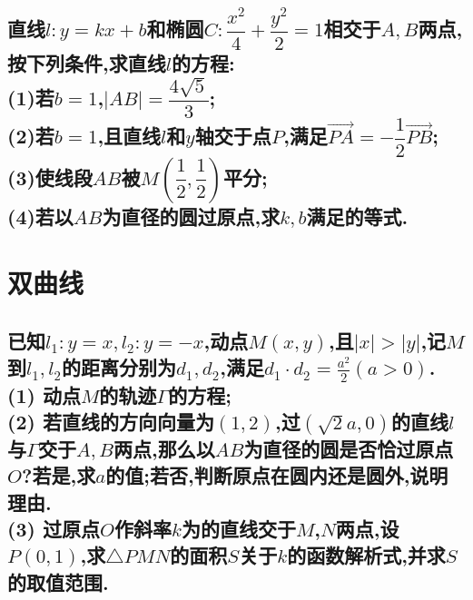 \documentclass[oneside]{book}
\newcommand{\1}{\underline{\makebox[1cm]{}}}
\newcommand{\2}{\underline{\makebox[2cm]{}}}
\newcommand{\3}{\underline{\makebox[3cm]{}}}
\newcommand{\4}{\underline{\makebox[4cm]{}}}
\newcommand{\xl}{\overrightarrow}
\begin{document}
        \section{直线$l:y=kx+b$和椭圆$C:\dfrac{x^2}{4}+\dfrac{y^2}{2}=1$相交于$A,B$两点,按下列条件,求直线$l$的方程:\\(1)若$b=1$,$|AB|=\dfrac{4\sqrt{5}}{3}$;\\(2)若$b=1$,且直线$l$和$y$轴交于点$P$,满足$\xl{PA}=-\dfrac{1}{2}\xl{PB}$;\\(3)使线段$AB$被$M( \dfrac{1}{2},\dfrac{1}{2})$平分;\\(4)若以$AB$为直径的圆过原点,求$k,b$满足的等式.}


    \chapter{双曲线}
        \section{已知$l_1: y = x, l_2: y = -x$,动点$M(x, y)$,且$|x| > |y|$,记$M$到$l_1, l_2$的距离分别为$d_1, d_2$,满足$d_1 \cdot d_2 = \frac{a^2}{2}(a > 0)$.
        \\(1) 动点$M$的轨迹$\Gamma$的方程;
        \\(2) 若直线的方向向量为$(1, 2)$,过$(\sqrt{2}a, 0)$的直线$l$与$\Gamma$交于$A, B$两点,那么以$AB$为直径的圆是否恰过原点$O$?若是,求$a$的值;若否,判断原点在圆内还是圆外,说明理由.
        \\(3) 过原点$O$作斜率$k$为的直线交于$M$,$N$两点,设$P(0, 1)$,求$\triangle PMN$的面积$S$关于$k$的函数解析式,并求$S$的取值范围.
        }
        
\end{document}
